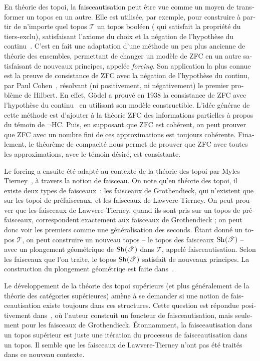 \begin{otherlanguage}{french}
En théorie des topoi, la faisceautisation peut être vue comme un moyen
de transformer un topos en un autre. Elle est utilisée, par exemple,
pour construire à partir de n'importe quel topos $\mathcal T$ un topos
booléen (\ie{} qui satisfait la propriété du tiers-exclu),
satisfaisant l'axiome du choix et la négation de l'hypothèse du
continu~\cite[Theorem VI.2.1]{maclanemoerdijk}.
C'est en fait une adaptation d'une méthode un peu plus ancienne de
théorie des ensembles, permettant de changer un modèle de ZFC en un
autre satisfaisant de nouveaux principes, appelée {\em forcing}. Son
application la plus connue est la preuve de consistance de ZFC avec la
négation de l'hypothèse du continu, par Paul Cohen~\cite{cohen1966},
résolvant (ni positivement, ni négativement) le premier problème de
Hilbert. En effet, Gödel a prouvé en 1938 la consistance de ZFC avec
l'hypothèse du continu~\cite{godel1938} en utilisant son modèle
constructible.
L'idée générae de cette méthode est d'ajouter à la théorie ZFC des
informations partielles à propos du témoin de $\lnot$HC. Puis, en
supposant que ZFC est cohérent, on peut prouver que ZFC avec un nombre
fini de ces approximations est toujours cohérente. Finalement, le
théorème de compacité nous permet de prouver que ZFC avec toutes les
approximations, \ie{} avec le témoin désiré, est consistante.

Le forcing a ensuite été adapté au contexte de la théorie des topoi
par Myles Tierney~\cite{tierney1972}, à travers la notion de
faisceau. On note qu'en théorie des topoi, il existe deux types de
faisceaux~: les faisceaux de Grothendieck, qui n'existent que sur les
topoi de préfaisceaux, et les faisceaux de Lawvere-Tierney. On peut
prouver que les faisceaux de Lawvere-Tierney, quand ils sont pris sur
un topos de préfaisceaux, correspondent exactement aux faisceaux de
Grothendieck ; on peut donc voir les premiers comme une généralisation
des seconds.
Étant donné un topos $\mathcal T$, on peut construire un nouveau topos
-- le topos des faisceaux $\mathrm{Sh}_{}(\mathcal T)$ -- avec un plongement
géométrique de $\mathrm{Sh}_{}(\mathcal T)$ dans $\mathcal T$, appelé
faisceautisation. Selon les faisceaux que l'on traite, le topos
$\mathrm{Sh}_{}(\mathcal T)$ satisfait de nouveaux principes. La construction
du plongement géométriqe est faite dans~\cite[Section
V.3]{maclanemoerdijk}.

Le développement de la théorie des topoi supérieurs (et plus
généralement de la théorie des catégories supérieures) amène à se
demander si une notion de faisceautisation existe toujours dans ces
structures. Cette question est répondue positivement
dans~\cite{lurie}, où l'auteur construit un foncteur de
faisceautisation, mais seulement pour les faisceaux de
Grothendieck. Étonnamment, la faisceautisation dans un topos supérieur
est juste une itération du processus de faisceautisation dans un
topos. Il semble que les faisceaux de Lawvere-Tierney n'ont pas été
traités dans ce nouveau contexte.


\end{otherlanguage}
